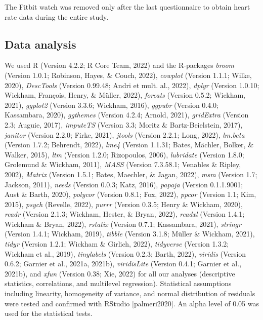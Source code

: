 \documentclass[
  man,floatsintext]{apa6}
\begin{document}
The Fitbit watch was removed only after the last questionnaire to obtain heart rate data during the entire study.

\hypertarget{data-analysis}{%
\subsection{Data analysis}\label{data-analysis}}

We used R (Version 4.2.2; R Core Team, 2022) and the R-packages \emph{broom} (Version 1.0.1; Robinson, Hayes, \& Couch, 2022), \emph{cowplot} (Version 1.1.1; Wilke, 2020), \emph{DescTools} (Version 0.99.48; Andri et mult. al., 2022), \emph{dplyr} (Version 1.0.10; Wickham, François, Henry, \& Müller, 2022), \emph{forcats} (Version 0.5.2; Wickham, 2021), \emph{ggplot2} (Version 3.3.6; Wickham, 2016), \emph{ggpubr} (Version 0.4.0; Kassambara, 2020), \emph{ggthemes} (Version 4.2.4; Arnold, 2021), \emph{gridExtra} (Version 2.3; Auguie, 2017), \emph{imputeTS} (Version 3.3; Moritz \& Bartz-Beielstein, 2017), \emph{janitor} (Version 2.2.0; Firke, 2021), \emph{jtools} (Version 2.2.1; Long, 2022), \emph{lm.beta} (Version 1.7.2; Behrendt, 2022), \emph{lme4} (Version 1.1.31; Bates, Mächler, Bolker, \& Walker, 2015), \emph{ltm} (Version 1.2.0; Rizopoulos, 2006), \emph{lubridate} (Version 1.8.0; Grolemund \& Wickham, 2011), \emph{MASS} (Version 7.3.58.1; Venables \& Ripley, 2002), \emph{Matrix} (Version 1.5.1; Bates, Maechler, \& Jagan, 2022), \emph{msm} (Version 1.7; Jackson, 2011), \emph{needs} (Version 0.0.3; Katz, 2016), \emph{papaja} (Version 0.1.1.9001; Aust \& Barth, 2020), \emph{polycor} (Version 0.8.1; Fox, 2022), \emph{ppcor} (Version 1.1; Kim, 2015), \emph{psych} (Revelle, 2022), \emph{purrr} (Version 0.3.5; Henry \& Wickham, 2020), \emph{readr} (Version 2.1.3; Wickham, Hester, \& Bryan, 2022), \emph{readxl} (Version 1.4.1; Wickham \& Bryan, 2022), \emph{rstatix} (Version 0.7.1; Kassambara, 2021), \emph{stringr} (Version 1.4.1; Wickham, 2019), \emph{tibble} (Version 3.1.8; Müller \& Wickham, 2021), \emph{tidyr} (Version 1.2.1; Wickham \& Girlich, 2022), \emph{tidyverse} (Version 1.3.2; Wickham et al., 2019), \emph{tinylabels} (Version 0.2.3; Barth, 2022), \emph{viridis} (Version 0.6.2; Garnier et al., 2021a, 2021b), \emph{viridisLite} (Version 0.4.1; Garnier et al., 2021b), and \emph{xfun} (Version 0.38; Xie, 2022) for all our analyses (descriptive statistics, correlations, and multilevel regression). Statistical assumptions including linearity, homogeneity of variance, and normal distribution of residuals were tested and confirmed with RStudio {[}palmeri2020{]}. An alpha level of 0.05 was used for the statistical tests.
\end{document}
